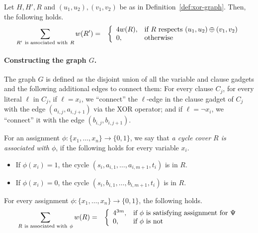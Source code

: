 \documentclass[11pt, a4paper]{article}
\begin{document}
\begin{lemma}
\label{lem:xor-graph}
Let $H,H',R$ and $(u_1,u_2),(v_1,v_2)$ be as in Definition~\ref{def:xor-graph}.
Then, the following holds.
\begin{eqnarray*}
\sum_{R'\ \textup{is associated with}\ R} w(R') & = & 
\left\{
\begin{array}{ll}
4w(R), & \text{if}\ R \ \text{respects}\ (u_1,u_2)\oplus(v_1,v_2)
\\
0, & \text{otherwise}
\end{array}
\right.
\end{eqnarray*}
\end{lemma}



\paragraph*{Constructing the graph $G$.}
The graph $G$ is defined as the disjoint union of all the variable and clause gadgets
and the following additional edges to connect them:
For every clause $C_j$, for every literal $\ell$ in $C_j$,
if $\ell= x_i$, we ``connect'' the $\ell$-edge in the clause gadget of $C_j$
with the edge $(a_{i,j},a_{i,j+1})$ via the XOR operator;
and if $\ell= \neg x_i$, we ``connect'' it
with the edge $(b_{i,j},b_{i,j+1})$.

For an assignment $\phi:\{x_1,\ldots,x_n\}\to \{0,1\}$,
we say that {\em a cycle cover $R$ is associated with $\phi$}, if the following holds for every variable $x_i$.
\begin{itemize}
\item 
If $\phi(x_i)=1$, 
the cycle $(s_i,a_{i,1},\ldots,a_{i,m+1},t_i)$ is in $R$.
\item
If $\phi(x_i)=0$, 
the cycle $(s_i,b_{i,1},\ldots,b_{i,m+1},t_i)$ is in $R$.
\end{itemize}

\begin{lemma}
\label{lem:cycle-cover-assignment}
For every assignment $\phi:\{x_1,\ldots,x_n\}\to\{0,1\}$, the following holds.
\begin{eqnarray*}
\sum_{R \ \textup{is associated with}\ \phi} w(R) & = &
\left\{
\begin{array}{ll}
4^{3m}, & \text{if}\ \phi\ \text{is satisfying assignment for}\ \Psi
\\
0, & \text{if}\ \phi \ \text{is not}

\end{array}
\right.
\end{eqnarray*}
\end{lemma}
\end{document}
